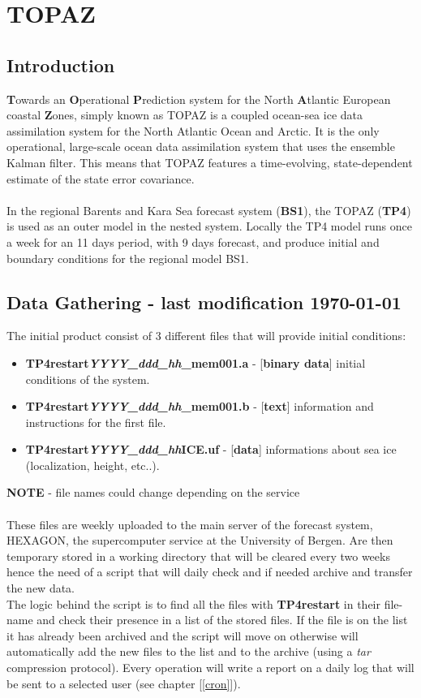 \documentclass[12pt,a4paper]{report}
\begin{document}
\section{TOPAZ}
\subsection{Introduction}
\textbf{T}owards an \textbf{O}perational \textbf{P}rediction system for the North \textbf{A}tlantic European coastal \textbf{Z}ones, simply known as TOPAZ is a coupled ocean-sea ice data assimilation system for the North Atlantic Ocean and Arctic. It is the only operational, large-scale ocean data assimilation system that uses the ensemble Kalman filter. This means that TOPAZ features a time-evolving, state-dependent estimate of the state error covariance. \\ \\
In the regional Barents and Kara Sea forecast system (\textbf{BS1}), the TOPAZ (\textbf{TP4}) is used as an outer model in the nested system. Locally the TP4 model runs once a week for an 11 days period, with 9 days forecast, and produce initial and boundary conditions for the regional model BS1.
\subsection{Data Gathering - last modification \today}
The initial product consist of 3 different files that will provide initial conditions:
\begin{itemize}
\item \textbf{TP4restart\textit{YYYY\_ddd\_hh}\_mem001.a} - [\textbf{binary data}] initial conditions of the system.
\item \textbf{TP4restart\textit{YYYY\_ddd\_hh}\_mem001.b} - [\textbf{text}] information and instructions for the first file.
\item \textbf{TP4restart\textit{YYYY\_ddd\_hh}ICE.uf} - [\textbf{data}] informations about sea ice (localization, height, etc..).
\end{itemize}
\textbf{NOTE} - file names could change depending on the service \\ \\
These files are weekly uploaded to the main server of the forecast system, HEXAGON, the supercomputer service at the University of Bergen. Are then temporary stored in a working directory that will be cleared every two weeks hence the need of a script that will daily check and if needed archive and transfer the new data. \\
The logic behind the script is to find all the files with \textbf{TP4restart} in their file-name and check their presence in a list of the stored files. If the file is on the list it has already been archived and the script will move on otherwise will automatically add the new files to the list and to the archive (using a \textit{tar} compression protocol). Every operation will write a report on a daily log that will be sent to a selected user (see chapter [\ref{cron}]).

%
%
%

\end{document}

